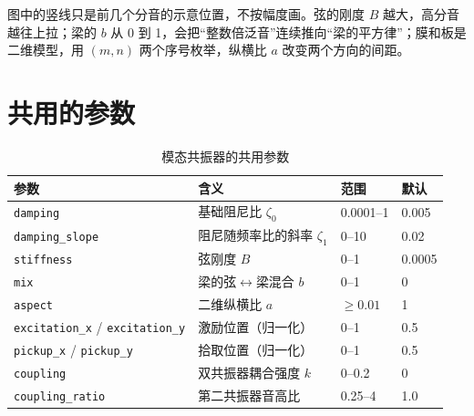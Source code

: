 \begin{center}
\end{center}

图中的竖线只是前几个分音的示意位置，不按幅度画。弦的刚度 $B$ 越大，高分音越往上拉；梁的 $b$ 从 0 到 1，会把“整数倍泛音”连续推向“梁的平方律”；膜和板是二维模型，用 $(m,n)$ 两个序号枚举，纵横比 $a$ 改变两个方向的间距。

\section{共用的参数}

\begin{table}[htbp]
\centering
\small
\begin{tabular}{@{}llll@{}}
\hline
参数 & 含义 & 范围 & 默认 \\
\hline
\texttt{damping} & 基础阻尼比 $\zeta_0$ & 0.0001–1 & 0.005 \\
\texttt{damping\_slope} & 阻尼随频率比的斜率 $\zeta_1$ & 0–10 & 0.02 \\
\texttt{stiffness} & 弦刚度 $B$ & 0–1 & 0.0005 \\
\texttt{mix} & 梁的弦$\leftrightarrow$梁混合 $b$ & 0–1 & 0 \\
\texttt{aspect} & 二维纵横比 $a$ & $\ge0.01$ & 1 \\
\texttt{excitation\_x} / \texttt{excitation\_y} & 激励位置（归一化） & 0–1 & 0.5 \\
\texttt{pickup\_x} / \texttt{pickup\_y} & 拾取位置（归一化） & 0–1 & 0.5 \\
\texttt{coupling} & 双共振器耦合强度 $k$ & 0–0.2 & 0 \\
\texttt{coupling\_ratio} & 第二共振器音高比 & 0.25–4 & 1.0 \\
\hline
\end{tabular}
\caption{模态共振器的共用参数}
\label{tab:modal-params}
\end{table}

